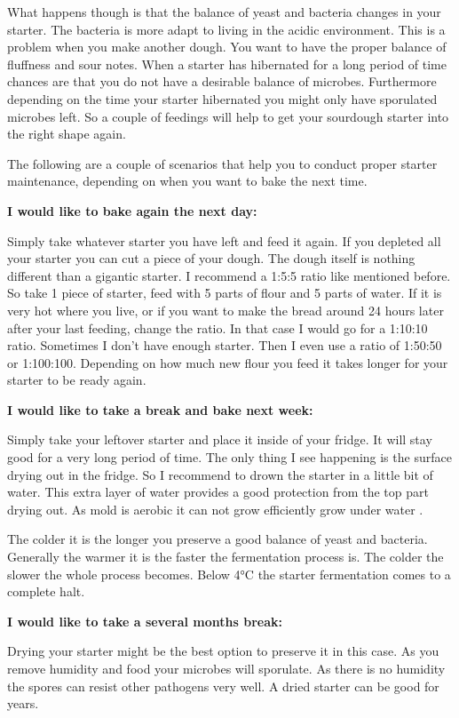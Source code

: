 What happens though is that the balance of yeast and
bacteria changes in your starter. The bacteria is more adapt to living
in the acidic environment. This is a problem when you make another dough.
You want to have the proper balance of fluffness and sour notes.
When a starter has hibernated for a long period
of time chances are that you do not have a desirable balance of microbes.
Furthermore depending on the time your starter hibernated you might only have
sporulated microbes left. So a couple of feedings will help to get your
sourdough starter into the right shape again.

The following are a couple of scenarios that help you to conduct proper
starter maintenance, depending on when you want to bake the next time.

\textbf{I would like to bake again the next day:}

Simply take whatever starter you have left and feed it again. If you depleted
all your starter you can cut a piece of your dough. The dough itself is
nothing different than a gigantic starter. I recommend a 1:5:5 ratio like
mentioned before. So take 1 piece of starter, feed with 5 parts of flour and 5
parts of water. If it is very hot where you live, or if you want to make the
bread around 24 hours later after your last feeding, change the ratio. In that
case I would go for a 1:10:10 ratio. Sometimes I don't have enough starter.
Then I even use a ratio of 1:50:50 or 1:100:100. Depending on how much new
flour you feed it takes longer for your starter to be ready again.

\textbf{I would like to take a break and bake next week:}

Simply take your leftover starter and place it inside of your fridge. It will stay good
for a very long period of time. The only thing I see happening is the surface
drying out in the fridge. So I recommend to drown the starter in a little bit
of water. This extra layer of water provides a good protection from the top
part drying out. As mold is aerobic it can not grow efficiently grow under
water \cite{mold+anaerobic}.

The colder it is the longer you preserve a good balance of yeast and
bacteria. Generally the warmer it is the faster the fermentation process is.
The colder the slower the whole process becomes.
Below 4°C the starter fermentation comes to a complete halt.

\textbf{I would like to take a several months break:}

Drying your starter might be the best option to preserve it in this case. As
you remove humidity and food your microbes will sporulate. As there is no
humidity the spores can resist other pathogens very well. A dried starter can
be good for years.

